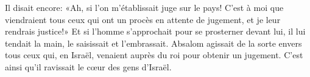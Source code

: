 Il disait encore: «Ah, si l’on m’établissait juge sur le pays!
	C’est à moi que viendraient tous ceux qui ont un procès en attente de jugement,
	et je leur rendrais justice!»
Et si l’homme s’approchait pour se prosterner devant lui,
	il lui tendait la main, le saisissait et l’embrassait.
Absalom agissait de la sorte envers tous ceux qui, en Israël,
	venaient auprès du roi pour obtenir un jugement.
C’est ainsi qu’il ravissait le cœur des gens d’Israël.
